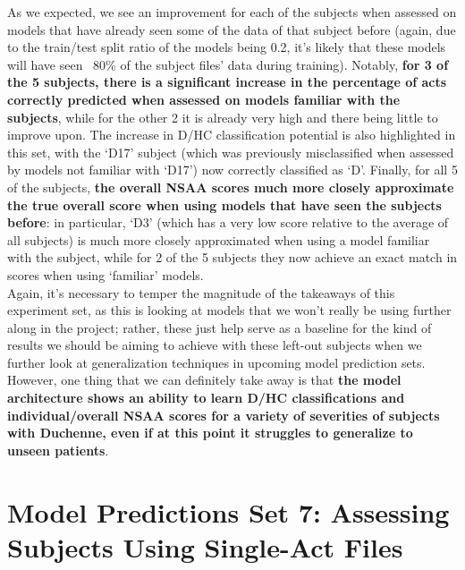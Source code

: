 \documentclass[12pt,twoside]{report}
\begin{document}
\quad As we expected, we see an improvement for each of the subjects when assessed on models that have already seen some of the data of that subject before (again, due to the train/test split ratio of the models being 0.2, it’s likely that these models will have seen ~80\% of the subject files’ data during training). Notably, \textbf{for 3 of the 5 subjects, there is a significant increase in the percentage of acts correctly predicted when assessed on models familiar with the subjects}, while for the other 2 it is already very high and there being little to improve upon. The increase in D/HC classification potential is also highlighted in this set, with the ‘D17’ subject (which was previously misclassified when assessed by models not familiar with ‘D17’) now correctly classified as ‘D’. Finally, for all 5 of the subjects, \textbf{the overall NSAA scores much more closely approximate the true overall score when using models that have seen the subjects before}: in particular, ‘D3’ (which has a very low score relative to the average of all subjects) is much more closely approximated when using a model familiar with the subject, while for 2 of the 5 subjects they now achieve an exact match in scores when using ‘familiar’ models.\\

\quad Again, it’s necessary to temper the magnitude of the takeaways of this experiment set, as this is looking at models that we won’t really be using further along in the project; rather, these just help serve as a baseline for the kind of results we should be aiming to achieve with these left-out subjects when we further look at generalization techniques in upcoming model prediction sets. However, one thing that we can definitely take away is that \textbf{the model architecture shows an ability to learn D/HC classifications and individual/overall NSAA scores for a variety of severities of subjects with Duchenne, even if at this point it struggles to generalize to unseen patients}.




\section{Model Predictions Set 7: Assessing Subjects Using Single-Act Files}
\end{document}
